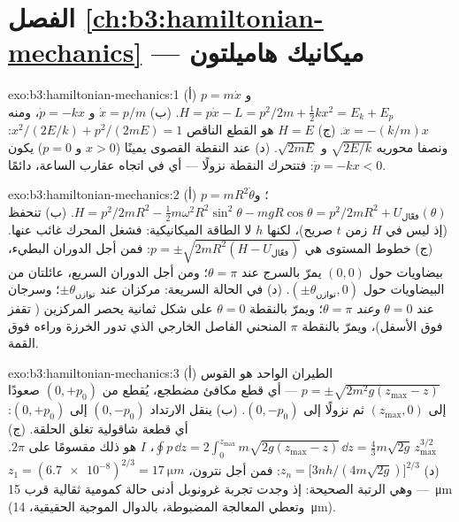 \section*{الفصل \ref{ch:b3:hamiltonian-mechanics} --- ميكانيك هاميلتون}

\begin{solution}{exo:b3:hamiltonian-mechanics:1}
(أ) $p = m\dot x$ و $H = p\dot x - L = p^2/2m + \tfrac12 kx^2 = E_k +
E_p$. (ب) $\dot x = p/m$ و $\dot p = -kx$، ومنه $\ddot x = -(k/m)x$.
(ج) $H = E$ هو القطع الناقص $x^2/(2E/k) + p^2/(2mE) = 1$: ونصفا محوريه
$\sqrt{2E/k}$ و $\sqrt{2mE}$. (د) عند النقطة القصوى يمينًا ($x > 0$
و $p = 0$) يكون $\dot p = -kx < 0$: فتتحرك النقطة نزولًا --- أي في
اتجاه عقارب الساعة، دائمًا.
\end{solution}

\begin{solution}{exo:b3:hamiltonian-mechanics:2}
(أ) $p = mR^2\dot\theta$؛ و $H = p^2/2mR^2 - \tfrac12 m\omega^2R^2
\sin^2\theta - mgR\cos\theta = p^2/2mR^2 + U_{\text{فعّال}}(\theta)$.
(ب) تنحفظ (إذ ليس في $H$ زمن $t$ صريح)، لكنها $h$ لا الطاقة
الميكانيكية: فشغل المحرك غائب عنها. (ج) خطوط المستوى هي
$p = \pm\sqrt{2mR^2(H - U_{\text{فعّال}})}$: فمن أجل الدوران البطيء،
بيضاويات حول $(0, 0)$  يمرّ بالسرج عند
$\theta = \pi$؛ ومن أجل الدوران السريع، عائلتان من البيضاويات حول
$(\pm\theta_{\text{توازن}}, 0)$. (د) في الحالة السريعة: مركزان عند
$\pm\theta_{\text{توازن}}$؛ وسرجان عند $\theta = 0$ \emph{وعند} $\theta =
\pi$؛ ويمرّ بالنقطة $\theta = 0$  على شكل ثمانية يحصر
المركزين ( تقفز فوق الأسفل)، ويمرّ
بالنقطة $\pi$ المنحني الفاصل الخارجي الذي تدور الخرزة وراءه
فوق القمة.
\end{solution}

\begin{solution}{exo:b3:hamiltonian-mechanics:3}
(أ) الطيران الواحد هو القوس $p = \pm\sqrt{2m^2g(z_{\max} - z)}$ --- أي
قطع مكافئ مضطجع، يُقطع من $(0, +p_0)$ صعودًا إلى
$(z_{\max}, 0)$ ثم نزولًا إلى $(0, -p_0)$. (ب) ينقل الارتداد
$(0, -p_0)$ إلى $(0, +p_0)$: أي قطعة شاقولية تغلق الحلقة. (ج)
$\oint p\,\dd z = 2\int_0^{z_{\max}}m\sqrt{2g(z_{\max} - z)}\,\dd z =
\tfrac43 m\sqrt{2g}\,z_{\max}^{3/2}$،  $I$ هو ذلك مقسومًا على $2\pi$. (د)
$z_n = \big[3nh/(4m\sqrt{2g})\big]^{2/3}$: فمن أجل نترون، $z_1 =
(\num{6.7e-8})^{2/3} = \qty{17}{\micro m}$ --- وهي الرتبة الصحيحة: إذ
وجدت تجربة غرونوبل أدنى حالة كمومية ثقالية قرب
\qty{15}{\micro m} (وتعطي المعالجة المضبوطة، بالدوال الموجية
الحقيقية، \qty{14}{\micro m}).
\end{solution}

